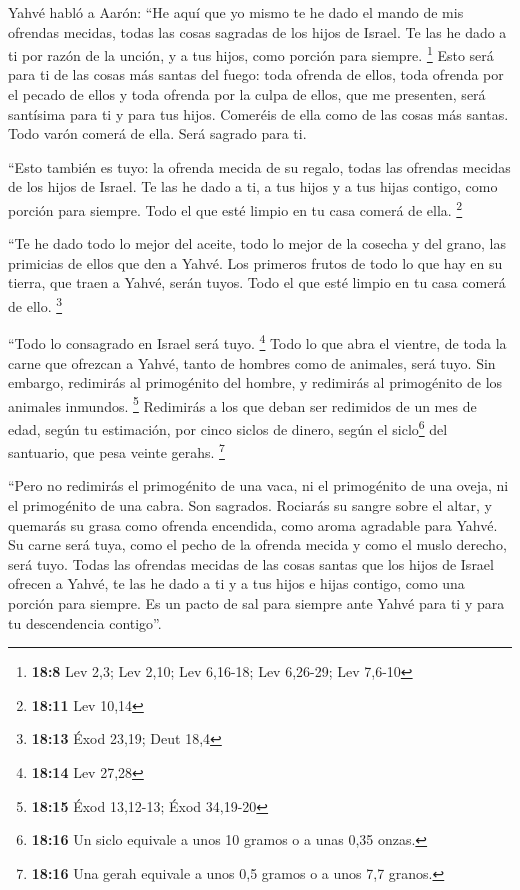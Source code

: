  Yahvé habló a Aarón: ``He aquí que yo mismo te he dado el
mando de mis ofrendas mecidas, todas las cosas sagradas de los hijos de
Israel. Te las he dado a ti por razón de la unción, y a tus hijos, como
porción para siempre. \footnote{\textbf{18:8} Lev 2,3; Lev 2,10; Lev
  6,16-18; Lev 6,26-29; Lev 7,6-10}  Esto será para ti de
las cosas más santas del fuego: toda ofrenda de ellos, toda ofrenda por
el pecado de ellos y toda ofrenda por la culpa de ellos, que me
presenten, será santísima para ti y para tus hijos. 
Comeréis de ella como de las cosas más santas. Todo varón comerá de
ella. Será sagrado para ti.

 ``Esto también es tuyo: la ofrenda mecida de su regalo,
todas las ofrendas mecidas de los hijos de Israel. Te las he dado a ti,
a tus hijos y a tus hijas contigo, como porción para siempre. Todo el
que esté limpio en tu casa comerá de ella. \footnote{\textbf{18:11} Lev
  10,14}

 ``Te he dado todo lo mejor del aceite, todo lo mejor de
la cosecha y del grano, las primicias de ellos que den a Yahvé.
 Los primeros frutos de todo lo que hay en su tierra, que
traen a Yahvé, serán tuyos. Todo el que esté limpio en tu casa comerá de
ello. \footnote{\textbf{18:13} Éxod 23,19; Deut 18,4}

 ``Todo lo consagrado en Israel será tuyo. \footnote{\textbf{18:14}
  Lev 27,28}  Todo lo que abra el vientre, de toda la
carne que ofrezcan a Yahvé, tanto de hombres como de animales, será
tuyo. Sin embargo, redimirás al primogénito del hombre, y redimirás al
primogénito de los animales inmundos. \footnote{\textbf{18:15} Éxod
  13,12-13; Éxod 34,19-20}  Redimirás a los que deban ser
redimidos de un mes de edad, según tu estimación, por cinco siclos de
dinero, según el siclo\footnote{\textbf{18:16} Un siclo equivale a unos
  10 gramos o a unas 0,35 onzas.} del santuario, que pesa veinte gerahs.
\footnote{\textbf{18:16} Una gerah equivale a unos 0,5 gramos o a unos
  7,7 granos.}

 ``Pero no redimirás el primogénito de una vaca, ni el
primogénito de una oveja, ni el primogénito de una cabra. Son sagrados.
Rociarás su sangre sobre el altar, y quemarás su grasa como ofrenda
encendida, como aroma agradable para Yahvé.  Su carne
será tuya, como el pecho de la ofrenda mecida y como el muslo derecho,
será tuyo.  Todas las ofrendas mecidas de las cosas
santas que los hijos de Israel ofrecen a Yahvé, te las he dado a ti y a
tus hijos e hijas contigo, como una porción para siempre. Es un pacto de
sal para siempre ante Yahvé para ti y para tu descendencia contigo''.

